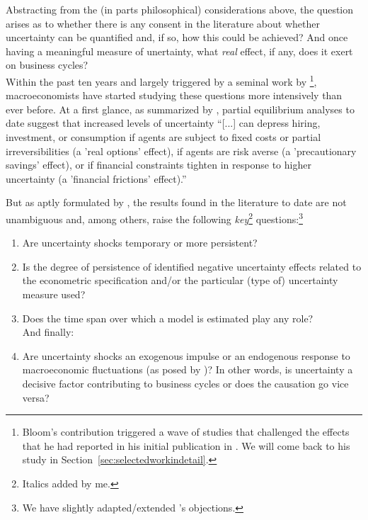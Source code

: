 \documentclass[a4paper,11pt,listof=nochaptergap,oneside,pointednumbers,bibtotoc,bigheadings,liststotoc]{scrbook}
\theoremstyle{mysatz}
\theoremstyle{mydefinition}
\theoremstyle{mytheorem}
\theoremstyle{mybemerkung}
\begin{document}
Abstracting from the (in parts philosophical) considerations above, the question arises as to whether there is any consent in the literature about whether uncertainty can be quantified and, if so, how this could be achieved? And once having a meaningful measure of unertainty, what \textit{real} effect, if any, does it exert on business cycles?\\

Within the past ten years and largely triggered by a seminal work by \citet{bloom:09}\footnote{Bloom's contribution triggered a wave of studies that challenged the effects that he had reported in his initial publication in \citet{bloom:09}. We will come back to his study in Section~\ref{sec:selectedworkindetail}.}, macroeconomists have started studying these questions more intensively than ever before. At a first glance, as summarized by \citet[p. 1177]{juradoetal:15}, partial equilibrium analyses to date suggest that increased levels of uncertainty ``[...] can depress hiring, investment, or consumption if agents are subject to fixed costs or partial irreversibilities (a 'real options' effect), if agents are risk averse (a 'precautionary savings' effect), or if financial constraints tighten in response to higher uncertainty (a 'financial frictions' effect).''

But as aptly formulated by \citet[p. 24]{bontempietal:16}, the results found in the literature to date are not unambiguous and, among others, raise the following \textit{key}\footnote{Italics added by me.} questions:\footnote{We have slightly adapted/extended \citet{bontempietal:16}'s objections.}
\begin{enumerate}
	\item Are uncertainty shocks temporary or more persistent?
	\item Is the degree of persistence of identified negative uncertainty effects related to the econometric specification and/or the particular (type of) uncertainty measure used? 
	\item Does the time span over which a model is estimated play any role? \\
	And finally:
	\item Are uncertainty shocks an exogenous impulse or an endogenous response to macroeconomic fluctuations (as posed by \citealp{ludvigsonetal:18})? In other words, is uncertainty a decisive factor contributing to business cycles or does the causation go vice versa?
\end{enumerate}
\end{document}
